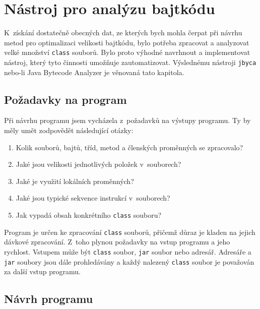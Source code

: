 \chapter{Nástroj pro analýzu bajtkódu}\label{Jbyca}


K~získání dostatečně obecných dat, ze kterých bych mohla čerpat při návrhu metod pro optimalizaci velikosti bajtkódu, bylo potřeba zpracovat a analyzovat velké množství \texttt{class} souborů. Bylo proto výhodné navrhnout a implementovat nástroj, který tyto činnosti umožňuje zautomatizovat. Výslednému nástroji \texttt{jbyca} nebo-li Java Bytecode Analyzer je věnovaná tato kapitola.

\section{Požadavky na program}\label{Jbyca:Requirements}


Při návrhu programu jsem vycházela z~požadavků na výstupy programu.
Ty by měly umět zodpovědět následující otázky: 

\begin{enumerate}
\setlength{\itemsep}{0pt}
\setlength{\parskip}{0pt}
\item Kolik souborů, bajtů, tříd, metod a členských proměnných se zpracovalo? 
\item Jaké jsou velikosti jednotlivých položek v~souborech? 
\item Jaké je využití lokálních proměnných? 
\item Jaké jsou typické sekvence instrukcí v~souborech?
\item Jak vypadá obsah konkrétního \texttt{class} souboru? 
\end{enumerate}

Program je určen ke zpracování \texttt{class} souborů, přičemž důraz je kladen na jejich dávkové zpracování. Z~toho plynou požadavky na vstup programu a jeho rychlost. Vstupem může být \texttt{class} soubor, \texttt{jar} soubor nebo adresář. Adresáře a \texttt{jar} soubory jsou dále prohledávány a každý nalezený \texttt{class} soubor je považován za další vstup programu. 

\section{Návrh programu}\label{Jbyca:Design}

